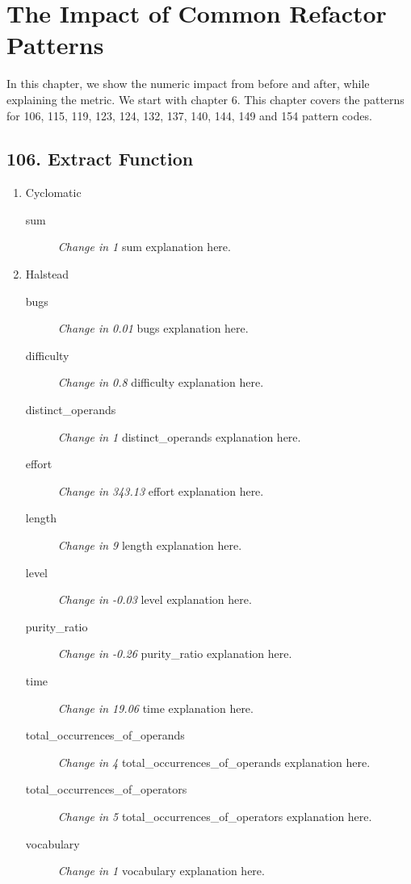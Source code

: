 \section{The Impact of Common Refactor Patterns}

In this chapter, we show the numeric impact from before and after, while explaining the metric. We start with chapter 6.
This chapter covers the patterns for 106, 115, 119, 123, 124, 132, 137, 140, 144, 149 and 154 pattern codes.

\subsection{ 106.  Extract Function }

\begin{enumerate}
  \item Cyclomatic
        \begin{description}
          \item [sum] \textit{Change in 1} sum explanation here.
        \end{description}
  \item Halstead
        \begin{description}
          \item [bugs] \textit{Change in 0.01} bugs explanation here.
          \item [difficulty] \textit{Change in 0.8} difficulty explanation here.
          \item [distinct\_operands] \textit{Change in 1} distinct\_operands explanation here.
          \item [effort] \textit{Change in 343.13} effort explanation here.
          \item [length] \textit{Change in 9} length explanation here.
          \item [level] \textit{Change in -0.03} level explanation here.
          \item [purity\_ratio] \textit{Change in -0.26} purity\_ratio explanation here.
          \item [time] \textit{Change in 19.06} time explanation here.
          \item [total\_occurrences\_of\_operands] \textit{Change in 4} total\_occurrences\_of\_operands explanation here.
          \item [total\_occurrences\_of\_operators] \textit{Change in 5} total\_occurrences\_of\_operators explanation here.
          \item [vocabulary] \textit{Change in 1} vocabulary explanation here.

\end{description}
\end{enumerate}
